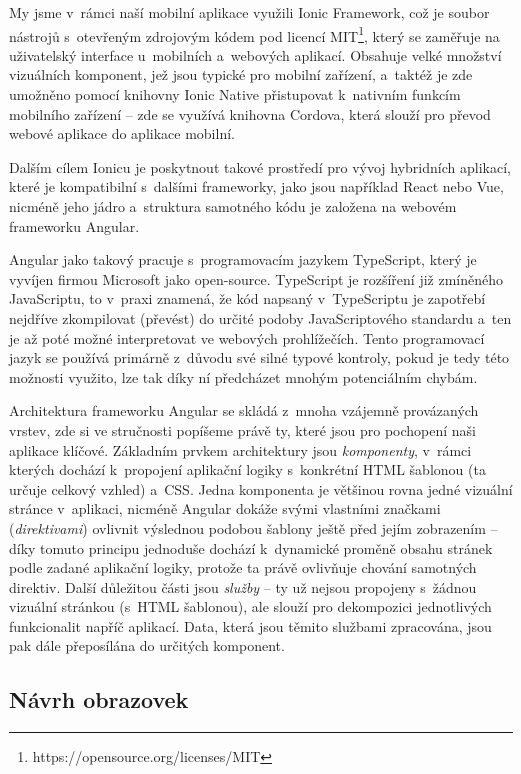 My jsme v~rámci naší mobilní aplikace využili Ionic Framework, což je
soubor nástrojů s~otevřeným zdrojovým kódem pod licencí
MIT\footnote{https://opensource.org/licenses/MIT}, který se zaměřuje na
uživatelský interface u~mobilních a~webových aplikací. Obsahuje velké
množství vizuálních komponent, jež jsou typické pro mobilní zařízení,
a~taktéž je zde umožněno pomocí knihovny Ionic Native přistupovat
k~nativním funkcím mobilního zařízení -- zde se využívá knihovna Cordova,
která slouží pro převod webové aplikace do aplikace mobilní.
\parencite{cordova}

Dalším cílem Ionicu je poskytnout takové prostředí pro vývoj hybridních
aplikací, které je kompatibilní s~dalšími frameworky, jako jsou
například React nebo Vue, nicméně jeho jádro a~struktura samotného kódu
je založena na webovém frameworku Angular.~\parencite{ionic}

Angular jako takový pracuje s~programovacím jazykem TypeScript, který je
vyvíjen firmou Microsoft jako open-source. TypeScript je rozšíření již
zmíněného JavaScriptu, to v~praxi znamená, že kód napsaný v~TypeScriptu
je zapotřebí nejdříve zkompilovat (převést) do určité podoby
JavaScriptového standardu a~ten je až poté možné interpretovat ve
webových prohlížečích. Tento programovací jazyk se používá primárně
z~důvodu své silné typové kontroly, pokud je tedy této možnosti využito,
lze tak díky ní předcházet mnohým potenciálním chybám.
\parencite{typescript}

Architektura frameworku Angular se skládá z~mnoha vzájemně provázaných
vrstev, zde si ve stručnosti popíšeme právě ty, které jsou pro pochopení
naši aplikace klíčové. Základním prvkem architektury jsou
\emph{komponenty}, v~rámci kterých dochází k~propojení aplikační logiky
s~konkrétní HTML šablonou (ta určuje celkový vzhled) a~CSS. Jedna
komponenta je většinou rovna jedné vizuální stránce v~aplikaci, nicméně
Angular dokáže svými vlastními značkami (\emph{direktivami}) ovlivnit
výslednou podobou šablony ještě před jejím zobrazením -- díky tomuto
principu jednoduše dochází k~dynamické proměně obsahu stránek podle
zadané aplikační logiky, protože ta právě ovlivňuje chování samotných
direktiv. Další důležitou části jsou \emph{služby} -- ty už nejsou
propojeny s~žádnou vizuální stránkou (s~HTML šablonou), ale slouží pro
dekompozici jednotlivých funkcionalit napříč aplikací. Data, která jsou
těmito službami zpracována, jsou pak dále přeposílána do určitých
komponent.~\parencite{angulararchitecture}

\hypertarget{nuxe1vrh-obrazovek}{%
\subsection{Návrh obrazovek}\label{nuxe1vrh-obrazovek}}


